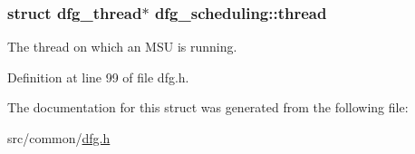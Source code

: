 \hypertarget{structdfg__scheduling_af63999d85b15782bbfc667be6b227fa7}{
\subsubsection[{thread}]{\setlength{\rightskip}{0pt plus 5cm}struct {\bf dfg\-\_\-thread}$\ast$ dfg\-\_\-scheduling\-::thread}}\label{structdfg__scheduling_af63999d85b15782bbfc667be6b227fa7}


The thread on which an M\-S\-U is running. 



Definition at line 99 of file dfg.\-h.



The documentation for this struct was generated from the following file\-:\begin{DoxyCompactItemize}
\item 
src/common/\hyperlink{dfg_8h}{dfg.\-h}\end{DoxyCompactItemize}
